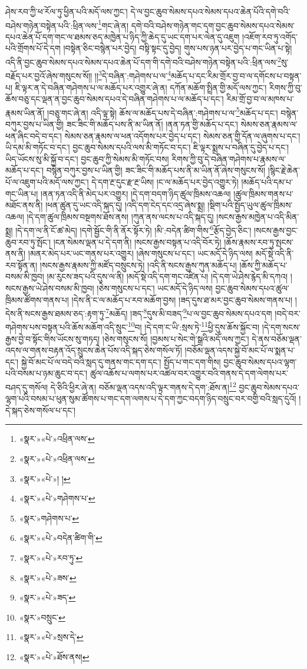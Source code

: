 ཤེས་རབ་ཀྱི་ཕ་རོལ་ཏུ་ཕྱིན་པའི་མདོ་ལས་ཀྱང་། དེ་ལ་བྱང་ཆུབ་སེམས་དཔའ་སེམས་དཔའ་ཆེན་པོའི་དགེ་བའི་བཤེས་གཉེན་བསྟེན་པའི་:ཕྲིན་ལས་\footnote{«སྣར་»«པེ་»འཕྲིན་ལས་}གང་ཞེ་ན། དགེ་བའི་བཤེས་གཉེན་གང་དག་བྱང་ཆུབ་སེམས་དཔའ་སེམས་དཔའ་ཆེན་པོ་དག་གང་ལ་ཐམས་ཅད་མཁྱེན་པ་ཉིད་ཀྱི་ཆེད་དུ་ཡང་དག་པར་ལེན་དུ་འཇུག །འཇོག་རབ་ཏུ་འགོད་པའི་གྲོགས་པོ་དེ་དག །བསྟེན་ཅིང་བསྙེན་པར་བྱེད། བསྟི་སྟང་དུ་བྱེད། གུས་པས་ཉན་པར་བྱེད་པ་གང་ཡིན་པ་སྟེ། འདི་ནི་བྱང་ཆུབ་སེམས་དཔའ་སེམས་དཔའ་ཆེན་པོ་དག་གི་དགེ་བའི་བཤེས་གཉེན་བསྟེན་པའི་:ཕྲིན་ལས་\footnote{«སྣར་»«པེ་»འཕྲིན་ལས་}སུ་བརྗོད་པར་བྱའོ་ཞེས་གསུངས་སོ།། །།\footnote{«སྣར་»«པེ་»། །}དེ་བཞིན་:གཤེགས་པ་ལ་\footnote{«སྣར་»«པེ་»གཤེགས་པ་}མཆོད་པ་དང་རིམ་གྲོར་བྱ་བ་ལ་དགོངས་པ་བསྟན་པ། ཇི་ལྟར་ན་དེ་བཞིན་གཤེགས་པ་ལ་མཆོད་པར་འགྱུར་ཞེ་ན། དཀོན་མཆོག་སྤྲིན་གྱི་མདོ་ལས་ཀྱང་། རིགས་ཀྱི་བུ་ཆོས་བཅུ་དང་ལྡན་ན་བྱང་ཆུབ་སེམས་དཔའ་དེ་བཞིན་གཤེགས་པ་ལ་མཆོད་པ་དང་། རིམ་གྲོ་བྱ་བ་ལ་མཁས་པ་རྣམས་ཡིན་ནོ། །བཅུ་གང་ཞེ་ན། འདི་ལྟ་སྟེ། ཆོས་ལ་མཆོད་པས་དེ་བཞིན་:གཤེགས་པ་ལ་\footnote{«སྣར་»གཤེགས་པ་}མཆོད་པ་དང་། བསྙེན་བཀུར་བྱས་པ་ཡིན་གྱི། ཟང་ཟིང་གི་མཆོད་པས་ནི་མ་ཡིན་ནོ། །ནན་ཏན་གྱི་མཆོད་པ་དང་། སེམས་ཅན་རྣམས་ལ་ཕན་ཞིང་བདེ་བ་དང་། སེམས་ཅན་རྣམས་ལ་ཕན་འདོགས་པར་བྱེད་པ་དང་། སེམས་ཅན་གྱི་དོན་ལ་ཞུགས་པ་དང་། ཡི་དམ་མི་གཏོང་བ་དང་། བྱང་ཆུབ་སེམས་དཔའི་ལས་མི་གཏོང་བ་དང་། ཇི་ལྟར་སྨྲས་པ་བཞིན་དུ་བྱེད་པ་དང་། ཡིད་ཡོངས་སུ་མི་སྐྱོ་བ་དང་། བྱང་ཆུབ་ཀྱི་སེམས་མི་གཏོང་བས། རིགས་ཀྱི་བུ་དེ་བཞིན་གཤེགས་པ་རྣམས་ལ་མཆོད་པ་དང་། བསྙེན་བཀུར་བྱས་པ་ཡིན་གྱི། ཟང་ཟིང་གི་མཆོད་པས་ནི་མ་ཡིན་ནོ་ཞེས་གསུངས་སོ། །སྙིང་རྗེ་ཆེན་པོ་ལ་འཇུག་པའི་མདོ་ལས་ཀྱང་། དེ་དག་རྔ་དུང་རྫ་རྔ་ཡིས། །ང་ལ་མཆོད་པར་བྱེད་འགྱུར་ཏེ། །མཆོད་པའི་དམ་པ་གང་ཡིན་པ། །ནན་ཏན་འདི་ནི་མེད་པར་འགྱུར། །དེ་དག་བདག་ཉིད་ཚུལ་ཁྲིམས་འཆལ། །ཚུལ་ཁྲིམས་གནས་པ་མཐོང་ནས་ནི། །ཕན་ཚུན་དུ་ཡང་འདི་སྐད་དུ། །འདི་དག་ངེད་དང་འདྲ་ཞེས་སྨྲ། །སྡིག་པའི་སྤྱོད་ཡུལ་ཚུལ་ཁྲིམས་འཆལ། །དེ་དག་ཚུལ་ཁྲིམས་བསྔགས་ཐོས་ནས། །ཀུན་ནས་ལངས་པ་འདི་སྐད་དུ། །སངས་རྒྱས་མཁྱེན་པ་འདི་མིན་སྨྲ། །དེ་དག་ལ་ནི་ངོ་ཚ་མེད། །དགེ་སྦྱོང་གི་ནི་ནོར་སྟོར་ཏེ། །མི་:བདེན་ཚིག་གིས་\footnote{«སྣར་»«པེ་»བདེན་ཚིག་གི་}རྩོད་བྱེད་ཅིང་། །སངས་རྒྱས་བྱང་ཆུབ་རབ་ཏུ་སྤོང་། །ངན་སེམས་ལྡན་པ་དེ་དག་ནི། །སངས་རྒྱས་བསྟན་པ་འདི་བོར་ཏེ། །ཆོས་རྣམས་རབ་ཏུ་སྤངས་ནས་ནི། །མནར་མེད་པར་ཡང་གནས་པར་འགྱུར། །ཞེས་གསུངས་པ་དང་། ཡང་མདོ་དེ་ཉིད་ལས། མདོ་སྡེ་འདི་ནི་རབ་སྟོན་ན། །སངས་རྒྱས་རྣམས་ཀྱི་མཛོད་བསྲུངས་ཏེ། །འདི་ནི་སངས་རྒྱས་ཀུན་མཆོད་པ། །ཆོས་ཀྱི་མཆོད་པ་བསམ་མི་ཁྱབ། །མ་རུངས་ཟད་པའི་དུས་ལ་ནི། །མདོ་སྡེ་འདི་དག་གང་འཛིན་པ། །དེ་དག་ཡེ་ཤེས་རྙེད་མི་དཀའ། །སངས་རྒྱས་ཡེ་ཤེས་བསམ་མི་ཁྱབ། །ཅེས་གསུངས་པ་དང་། ཡང་མདོ་དེ་ཉིད་ལས། བྱང་ཆུབ་སེམས་དཔའ་ཚུལ་ཁྲིམས་ཚོགས་གནས་པ། །དེས་ནི་ང་ལ་མཆོད་པ་རབ་མཆོག་བྱས། །ཟད་དུས་ཐ་མར་བྱང་ཆུབ་སེམས་གནས་པ། །དེས་ནི་སངས་རྒྱས་ཐམས་ཅད་:རྟག་ཏུ་\footnote{«སྣར་»«པེ་»རབ་ཏུ་}མཆོད། །ཟད་\footnote{«སྣར་»«པེ་»ཟས་}དུས་མི་བཟད་\footnote{«སྣར་»«པེ་»ཟད་}པ་ལ་བྱང་ཆུབ་སེམས་དཔའ་དག །བདེ་བར་གཤེགས་པས་བསྟན་པའི་ཆོས་མཆོག་འདི་སྲུང་\footnote{«སྣར་»བསྲུང་}བ། །དེ་དག་ང་ཡི་:སྲས་ཏེ་\footnote{«སྣར་»«པེ་»སྲས་དེ་}ཕྱི་དུས་ཆོས་སྐྱོང་བ། །དེ་དག་སངས་རྒྱས་བྱེ་བ་སྟོང་གིས་ཡོངས་སུ་གཏད། །ཅེས་གསུངས་སོ། །བྱམས་པ་སེང་གེ་སྒྲའི་མདོ་ལས་ཀྱང་། དེ་ནས་བཅོམ་ལྡན་འདས་ལ་གནས་བརྟན་འོད་སྲུངས་ཆེན་པོས་འདི་སྐད་ཅེས་གསོལ་ཏོ། །བཅོམ་ལྡན་འདས་སྐྱེ་བོ་མང་པོ་ལ་སྨན་པ་དང་། སྐྱེ་བོ་མང་པོ་ལ་བདེ་བའི་སླད་དུ་གནས་གང་དག་དང་། སྤྱོད་པ་གང་དག་གིས། བྱང་ཆུབ་སེམས་དཔའ་ལྷག་པའི་བསམ་པ་ཉམ་ཆུང་བ་དང་། ཚུལ་འཆོས་པ་ལགས་པར་འཚལ་བར་འགྱུར་བའི་གནས་དེ་དག་ལེགས་པར་བཤད་དུ་གསོལ། དེ་ཅིའི་ཕྱིར་ཞེ་ན། བཅོམ་ལྡན་འདས་འདི་ལྟར་གནས་དེ་དག་:ཐོས་ན།\footnote{«སྣར་»«པེ་»ཐོས་ནས།} བྱང་ཆུབ་སེམས་དཔའ་ལྷག་པའི་བསམ་པ་ཕུན་སུམ་ཚོགས་པ་གང་དག་ལགས་པ་དེ་དག་ཀྱང་བདག་ཉིད་བསྲུང་བར་བགྱི་བའི་སླད་དུའོ། །དེ་སྐད་ཅེས་གསོལ་པ་དང་། 